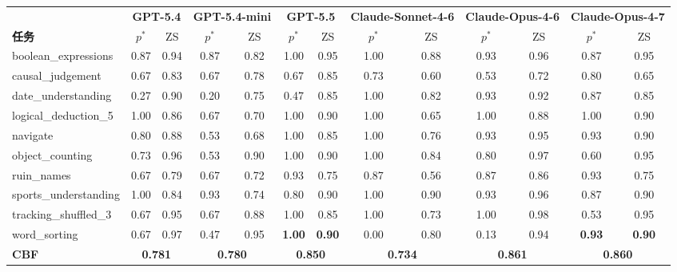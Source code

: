 \documentclass[11pt,a4paper,fontset=fandol]{ctexart}
\begin{document}
\begin{table}[h]
\centering
\scriptsize
\setlength{\tabcolsep}{3pt}
\begin{tabular}{l cc cc cc cc cc cc}
\toprule
& \multicolumn{2}{c}{\textbf{GPT-5.4}} & \multicolumn{2}{c}{\textbf{GPT-5.4-mini}} & \multicolumn{2}{c}{\textbf{GPT-5.5}} & \multicolumn{2}{c}{\textbf{Claude-Sonnet-4-6}} & \multicolumn{2}{c}{\textbf{Claude-Opus-4-6}} & \multicolumn{2}{c}{\textbf{Claude-Opus-4-7}} \\
\cmidrule(lr){2-3}\cmidrule(lr){4-5}\cmidrule(lr){6-7}\cmidrule(lr){8-9}\cmidrule(lr){10-11}\cmidrule(lr){12-13}
\textbf{任务} & $p^*$ & ZS & $p^*$ & ZS & $p^*$ & ZS & $p^*$ & ZS & $p^*$ & ZS & $p^*$ & ZS \\
\midrule
boolean\_expressions  & 0.87 & 0.94 & 0.87 & 0.82 & 1.00 & 0.95 & 1.00 & 0.88 & 0.93 & 0.96 & 0.87 & 0.95 \\
causal\_judgement     & 0.67 & 0.83 & 0.67 & 0.78 & 0.67 & 0.85 & 0.73 & 0.60 & 0.53 & 0.72 & 0.80 & 0.65 \\
date\_understanding   & 0.27 & 0.90 & 0.20 & 0.75 & 0.47 & 0.85 & 1.00 & 0.82 & 0.93 & 0.92 & 0.87 & 0.85 \\
logical\_deduction\_5 & 1.00 & 0.86 & 0.67 & 0.70 & 1.00 & 0.90 & 1.00 & 0.65 & 1.00 & 0.88 & 1.00 & 0.90 \\
navigate              & 0.80 & 0.88 & 0.53 & 0.68 & 1.00 & 0.85 & 1.00 & 0.76 & 0.93 & 0.95 & 0.93 & 0.90 \\
object\_counting      & 0.73 & 0.96 & 0.53 & 0.90 & 1.00 & 0.90 & 1.00 & 0.84 & 0.80 & 0.97 & 0.60 & 0.95 \\
ruin\_names           & 0.67 & 0.79 & 0.67 & 0.72 & 0.93 & 0.75 & 0.87 & 0.56 & 0.87 & 0.86 & 0.93 & 0.75 \\
sports\_understanding & 1.00 & 0.84 & 0.93 & 0.74 & 0.80 & 0.90 & 1.00 & 0.90 & 0.93 & 0.96 & 0.87 & 0.90 \\
tracking\_shuffled\_3 & 0.67 & 0.95 & 0.67 & 0.88 & 1.00 & 0.85 & 1.00 & 0.73 & 1.00 & 0.98 & 0.53 & 0.95 \\
word\_sorting         & 0.67 & 0.97 & 0.47 & 0.95 & \textbf{1.00} & \textbf{0.90} & 0.00 & 0.80 & 0.13 & 0.94 & \textbf{0.93} & \textbf{0.90} \\
\midrule
\textbf{CBF}          & \multicolumn{2}{c}{\textbf{0.781}} & \multicolumn{2}{c}{\textbf{0.780}} & \multicolumn{2}{c}{\textbf{0.850}} & \multicolumn{2}{c}{\textbf{0.734}} & \multicolumn{2}{c}{\textbf{0.861}} & \multicolumn{2}{c}{\textbf{0.860}} \\
\bottomrule
\end{tabular}
\end{table}
\end{document}
